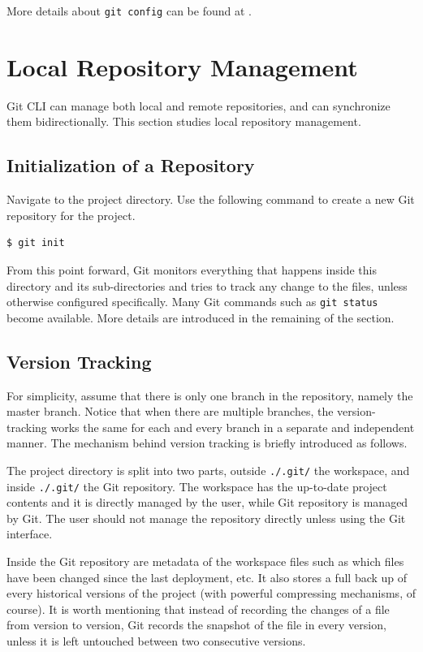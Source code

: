 More details about \verb|git config| can be found at \cite{git2025reference}.

\section{Local Repository Management}

Git CLI can manage both local and remote repositories, and can synchronize them bidirectionally. This section studies local repository management.

\subsection{Initialization of a Repository}

Navigate to the project directory. Use the following command to create a new Git repository for the project.
\begin{lstlisting}
$ git init
\end{lstlisting}
From this point forward, Git monitors everything that happens inside this directory and its sub-directories and tries to track any change to the files, unless otherwise configured specifically. Many Git commands such as \verb|git status| become available. More details are introduced in the remaining of the section.

\subsection{Version Tracking}

For simplicity, assume that there is only one branch in the repository, namely the master branch. Notice that when there are multiple branches, the version-tracking works the same for each and every branch in a separate and independent manner. The mechanism behind version tracking is briefly introduced as follows.

The project directory is split into two parts, outside \verb|./.git/| the workspace, and inside \verb|./.git/| the Git repository. The workspace has the up-to-date project contents and it is directly managed by the user, while Git repository is managed by Git. The user should not manage the repository directly unless using the Git interface.

Inside the Git repository are metadata of the workspace files such as which files have been changed since the last deployment, etc. It also stores a full back up of every historical versions of the project (with powerful compressing mechanisms, of course). It is worth mentioning that instead of recording the changes of a file from version to version, Git records the snapshot of the file in every version, unless it is left untouched between two consecutive versions.

